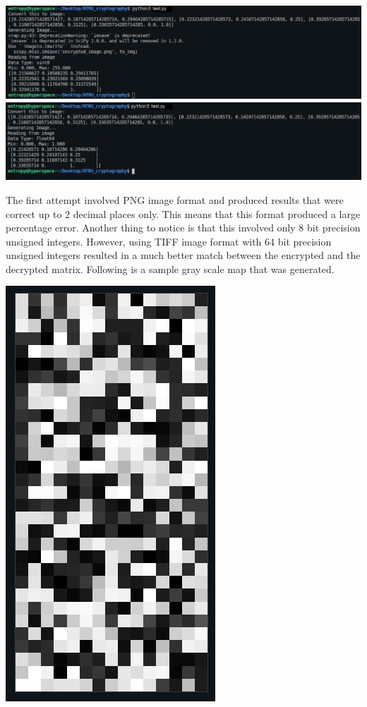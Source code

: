 \documentclass[a4paper,12pt]{article}
\begin{document}
\begin{center}
		\includegraphics[scale=0.53]{images/Attempt 1.jpg}
		\includegraphics[scale=0.53]{images/Attempt 2.jpg}
\end{center}

\begin{flushleft}
The first attempt involved PNG image format and produced results that were correct up to 2 decimal places only. This means that this format produced a large percentage error. Another thing to notice is that this involved only 8 bit precision unsigned integers. However, using TIFF image format with 64 bit precision unsigned integers resulted in a much better match between the encrypted and the decrypted matrix. Following is a sample gray scale map that was generated.
\end{flushleft}

\begin{center}
	\includegraphics[scale=0.59, angle=90]{images/grayscale map.jpg}
\end{center}
\end{document}
